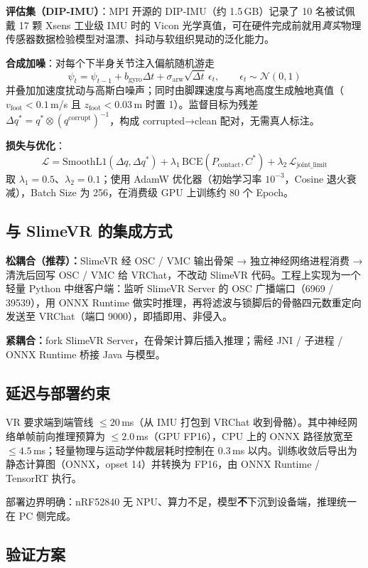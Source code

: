 \documentclass[scheme=plain,UTF8,11pt,a4paper]{ctexart}
\begin{document}
\textbf{评估集（DIP-IMU）}：MPI 开源的 DIP-IMU（约 1.5\,GB）记录了 10 名被试佩戴 17 颗 Xsens 工业级 IMU 时的 Vicon 光学真值，可在硬件完成前就用\emph{真实}物理传感器数据检验模型对温漂、抖动与软组织晃动的泛化能力。

\textbf{合成加噪}：对每个下半身关节注入偏航随机游走
\[
\psi_t = \psi_{t-1} + b_{\text{gyro}}\Delta t + \sigma_{\text{arw}}\sqrt{\Delta t}\,\epsilon_t,\qquad \epsilon_t \sim \mathcal{N}(0,1)
\]
并叠加加速度扰动与高斯白噪声；同时由脚踝速度与离地高度生成触地真值（$v_{\text{foot}} < 0.1$\,m/s 且 $z_{\text{foot}} < 0.03$\,m 时置 1）。监督目标为残差 $\Delta q^{*} = q^{*} \otimes (q^{\text{corrupt}})^{-1}$，构成 corrupted→clean 配对，无需真人标注。

\textbf{损失与优化}：
\[
\mathcal{L} = \text{SmoothL1}(\Delta q, \Delta q^{*}) + \lambda_1\,\text{BCE}(P_{\text{contact}}, C^{*}) + \lambda_2\,\mathcal{L}_{\text{joint\_limit}}
\]
取 $\lambda_1 = 0.5$、$\lambda_2 = 0.1$；使用 AdamW 优化器（初始学习率 $10^{-3}$，Cosine 退火衰减），Batch Size 为 256，在消费级 GPU 上训练约 80 个 Epoch。

\subsection{与 SlimeVR 的集成方式}

\textbf{松耦合（推荐）：}SlimeVR 经 OSC / VMC 输出骨架 → 独立神经网络进程消费 → 清洗后回写 OSC / VMC 给 VRChat，不改动 SlimeVR 代码。工程上实现为一个轻量 Python 中继客户端：监听 SlimeVR Server 的 OSC 广播端口（6969 / 39539），用 ONNX Runtime 做实时推理，再将滤波与锁脚后的骨骼四元数重定向发送至 VRChat（端口 9000），即插即用、非侵入。

\textbf{紧耦合：}fork SlimeVR Server，在骨架计算后插入推理；需经 JNI / 子进程 / ONNX Runtime 桥接 Java 与模型。

\subsection{延迟与部署约束}

VR 要求端到端管线 $\le 20$\,ms（从 IMU 打包到 VRChat 收到骨骼）。其中神经网络单帧前向推理预算为 $\le 2.0$\,ms（GPU FP16），CPU 上的 ONNX 路径放宽至 $\le 4.5$\,ms；轻量物理与运动学仲裁层耗时控制在 $0.3$\,ms 以内。训练收敛后导出为静态计算图（ONNX，opset 14）并转换为 FP16，由 ONNX Runtime / TensorRT 执行。

部署边界明确：nRF52840 无 NPU、算力不足，模型\textbf{不}下沉到设备端，推理统一在 PC 侧完成。

\subsection{验证方案}
\end{document}
